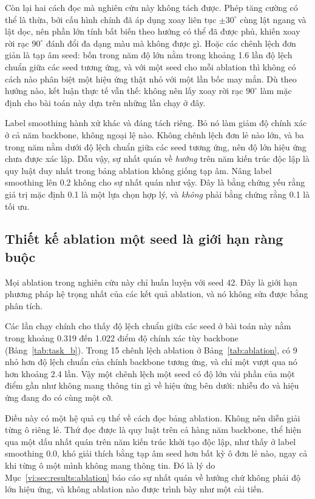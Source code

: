 Còn lại hai cách đọc mà nghiên cứu này không tách được. Phép tăng cường có thể
là thừa, bởi cấu hình chính đã áp dụng xoay liên tục $\pm30^\circ$ cùng lật
ngang và lật dọc, nên phần lớn tính bất biến theo hướng có thể đã được phủ,
khiến xoay rời rạc $90^\circ$ đánh đổi đa dạng màu mà không được gì. Hoặc các
chênh lệch đơn giản là tạp âm seed: bốn trong năm độ lớn nằm trong khoảng 1.6
lần độ lệch chuẩn giữa các seed tương ứng, và với một seed cho mỗi ablation thì
không có cách nào phân biệt một hiệu ứng thật nhỏ với một lần bốc may mắn. Dù
theo hướng nào, kết luận thực tế vẫn thế: không nên lấy xoay rời rạc
$90^\circ$ làm mặc định cho bài toán này dựa trên những lần chạy ở đây.

Label smoothing hành xử khác và đáng tách riêng. Bỏ nó làm giảm độ chính xác ở
cả năm backbone, không ngoại lệ nào. Không chênh lệch đơn lẻ nào lớn, và ba
trong năm nằm dưới độ lệch chuẩn giữa các seed tương ứng, nên độ lớn hiệu ứng
chưa được xác lập. Dẫu vậy, sự nhất quán về \emph{hướng} trên năm kiến trúc
độc lập là quy luật duy nhất trong bảng ablation không giống tạp âm. Nâng label
smoothing lên 0.2 không cho sự nhất quán như vậy. Đây là bằng chứng yếu rằng
giá trị mặc định 0.1 là một lựa chọn hợp lý, và \emph{không} phải bằng chứng
rằng 0.1 là tối ưu.

\subsection{Thiết kế ablation một seed là giới hạn ràng buộc}
\label{vi:sec:discussion:oneseed}

Mọi ablation trong nghiên cứu này chỉ huấn luyện với seed 42. Đây là giới hạn
phương pháp hệ trọng nhất của các kết quả ablation, và nó không sửa được bằng
phân tích.

Các lần chạy chính cho thấy độ lệch chuẩn giữa các seed ở bài toán này nằm
trong khoảng 0.319 đến 1.022 điểm độ chính xác tùy backbone
(Bảng~\ref{tab:task_b}). Trong 15 chênh lệch ablation ở
Bảng~\ref{tab:ablation}, có 9 nhỏ hơn độ lệch chuẩn của chính backbone tương
ứng, và chỉ một vượt qua nó hơn khoảng 2.4 lần. Vậy một chênh lệch một seed có
độ lớn vài phần của một điểm gần như không mang thông tin gì về hiệu ứng bên
dưới: nhiễu đo và hiệu ứng đang đo có cùng một cỡ.

Điều này có một hệ quả cụ thể về cách đọc bảng ablation. Không nên diễn giải
từng ô riêng lẻ. Thứ đọc được là quy luật trên cả hàng năm backbone, thể hiện qua một
dấu nhất quán trên năm kiến trúc khởi tạo độc lập, như thấy ở label smoothing
0.0, khó giải thích bằng tạp âm seed hơn bất kỳ ô đơn lẻ nào, ngay cả khi từng
ô một mình không mang thông tin. Đó là lý do
Mục~\ref{vi:sec:results:ablation} báo cáo sự nhất quán về hướng chứ không phải
độ lớn hiệu ứng, và không ablation nào được trình bày như một cải tiến.

